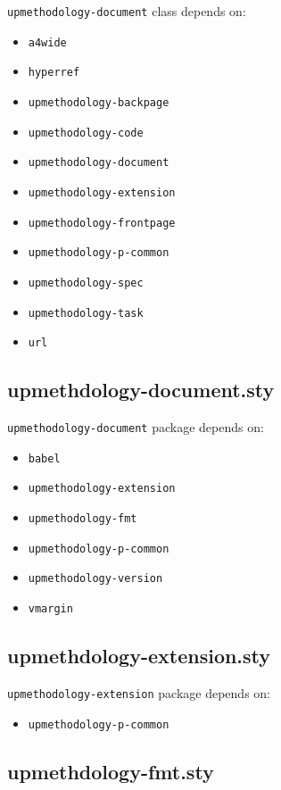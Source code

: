 \documentclass[book]{upmethodology-document}
\begin{document}
\texttt{upmethodology-document} class depends on:
\begin{itemize}
\item \texttt{a4wide}
\item \texttt{hyperref}
\item \texttt{upmethodology-backpage}
\item \texttt{upmethodology-code}
\item \texttt{upmethodology-document}
\item \texttt{upmethodology-extension}
\item \texttt{upmethodology-frontpage}
\item \texttt{upmethodology-p-common}
\item \texttt{upmethodology-spec}
\item \texttt{upmethodology-task}
\item \texttt{url}
\end{itemize}

\subsection{upmethdology-document.sty}

\texttt{upmethodology-document} package depends on:
\begin{itemize}
\item \texttt{babel}
\item \texttt{upmethodology-extension}
\item \texttt{upmethodology-fmt}
\item \texttt{upmethodology-p-common}
\item \texttt{upmethodology-version}
\item \texttt{vmargin}
\end{itemize}

\subsection{upmethdology-extension.sty}

\texttt{upmethodology-extension} package depends on:
\begin{itemize}
\item \texttt{upmethodology-p-common}
\end{itemize}

\subsection{upmethdology-fmt.sty}
\end{document}
